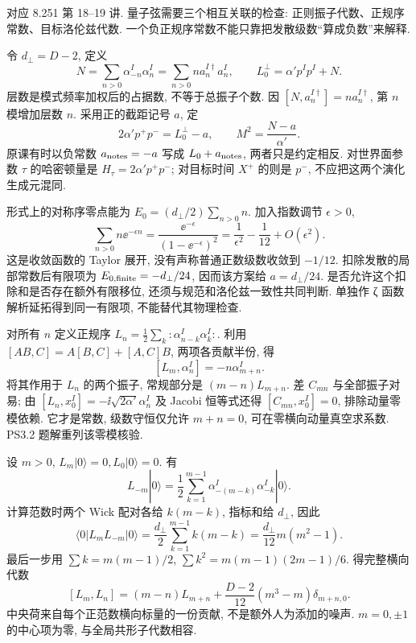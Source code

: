 \label{ch:basic-bosonic}
对应 8.251 第 18--19 讲. 量子弦需要三个相互关联的检查: 正则振子代数、正规序常数、目标洛伦兹代数. 一个负正规序常数不能只靠把发散级数“算成负数”来解释.

令 $d_\perp=D-2$, 定义
\[
 N=\sum_{n>0}\alpha_{-n}^I\alpha_n^I
 =\sum_{n>0}n a_n^{I\dagger}a_n^I,
 \qquad L_0^\perp=\alpha'p^Ip^I+N.
\]
层数是模式频率加权后的占据数, 不等于总振子个数. 因 $[N,a_n^{I\dagger}]=na_n^{I\dagger}$, 第 $n$ 模增加层数 $n$.
采用正的截距记号 $a$, 定
\[
 2\alpha'p^+p^-=L_0^\perp-a,
 \qquad M^2=\frac{N-a}{\alpha'}.
\]
原课有时以负常数 $a_{\rm notes}=-a$ 写成 $L_0+a_{\rm notes}$, 两者只是约定相反. 对世界面参数 $\tau$ 的哈密顿量是 $H_\tau=2\alpha'p^+p^-$; 对目标时间 $X^+$ 的则是 $p^-$, 不应把这两个演化生成元混同.

形式上的对称序零点能为 $E_0=(d_\perp/2)\sum_{n>0}n$. 加入指数调节 $\epsilon>0$,
\[
 \sum_{n>0}n\ee^{-\epsilon n}
 =\frac{\ee^{-\epsilon}}{(1-\ee^{-\epsilon})^2}
 =\frac1{\epsilon^2}-\frac1{12}+O(\epsilon^2).
\]
这是收敛函数的 Taylor 展开, 没有声称普通正数级数收敛到 $-1/12$. 扣除发散的局部常数后有限项为 $E_{0,\rm finite}=-d_\perp/24$, 因而该方案给 $a=d_\perp/24$. 是否允许这个扣除和是否存在额外有限移位, 还须与规范和洛伦兹一致性共同判断. 单独作 ζ 函数解析延拓得到同一有限项, 不能替代其物理检查.

对所有 $n$ 定义正规序 $L_n=\frac12\sum_k:\alpha_{n-k}^I\alpha_k^I:$.
利用 $[AB,C]=A[B,C]+[A,C]B$, 两项各贡献半份, 得
\[
 [L_m,\alpha_n^I]=-n\alpha_{m+n}^I.
\]
将其作用于 $L_n$ 的两个振子, 常规部分是 $(m-n)L_{m+n}$. 差 $C_{mn}$ 与全部振子对易; 由 $[L_n,x_0^I]=-\ii\sqrt{2\alpha'}\alpha_n^I$ 及 Jacobi 恒等式还得 $[C_{mn},x_0^I]=0$, 排除动量零模依赖. 它才是常数, 级数守恒仅允许 $m+n=0$, 可在零横向动量真空求系数. PS3.2 题解重列该零模核验.

设 $m>0$, $L_m|0\rangle=0,L_0|0\rangle=0$. 有
\[
 L_{-m}|0\rangle=\frac12\sum_{k=1}^{m-1}
 \alpha_{-(m-k)}^I\alpha_{-k}^I|0\rangle.
\]
计算范数时两个 Wick 配对各给 $k(m-k)$, 指标和给 $d_\perp$, 因此
\[
 \langle0|L_mL_{-m}|0\rangle
 =\frac{d_\perp}{2}\sum_{k=1}^{m-1}k(m-k)
 =\frac{d_\perp}{12}m(m^2-1).
\]
最后一步用 $\sum k=m(m-1)/2$, $\sum k^2=m(m-1)(2m-1)/6$. 得完整横向代数
\[
 [L_m,L_n]=(m-n)L_{m+n}
 +\frac{D-2}{12}(m^3-m)\delta_{m+n,0}.
\]
中央荷来自每个正范数横向标量的一份贡献, 不是额外人为添加的噪声. $m=0,\pm1$ 的中心项为零, 与全局共形子代数相容.

